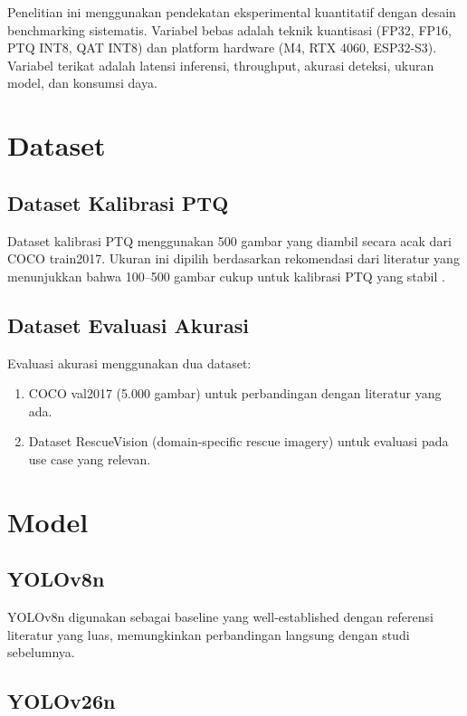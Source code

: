 \documentclass[12pt, a4paper]{report}
\begin{document}
Penelitian ini menggunakan pendekatan eksperimental kuantitatif dengan
desain benchmarking sistematis. Variabel bebas adalah teknik kuantisasi
(FP32, FP16, PTQ INT8, QAT INT8) dan platform hardware (M4, RTX 4060, ESP32-S3).
Variabel terikat adalah latensi inferensi, throughput, akurasi deteksi,
ukuran model, dan konsumsi daya.

\section{Dataset}

\subsection{Dataset Kalibrasi PTQ}

Dataset kalibrasi PTQ menggunakan 500 gambar yang diambil secara acak
dari COCO train2017. Ukuran ini dipilih berdasarkan rekomendasi dari
literatur yang menunjukkan bahwa 100--500 gambar cukup untuk kalibrasi
PTQ yang stabil \cite{banner2019post}.

\subsection{Dataset Evaluasi Akurasi}

Evaluasi akurasi menggunakan dua dataset:
\begin{enumerate}
  \item COCO val2017 (5.000 gambar) untuk perbandingan dengan literatur yang ada.
  \item Dataset RescueVision (domain-specific rescue imagery) untuk evaluasi
    pada use case yang relevan.
\end{enumerate}

\section{Model}

\subsection{YOLOv8n}

YOLOv8n digunakan sebagai baseline yang well-established dengan referensi
literatur yang luas, memungkinkan perbandingan langsung dengan studi sebelumnya.

\subsection{YOLOv26n}
\end{document}
